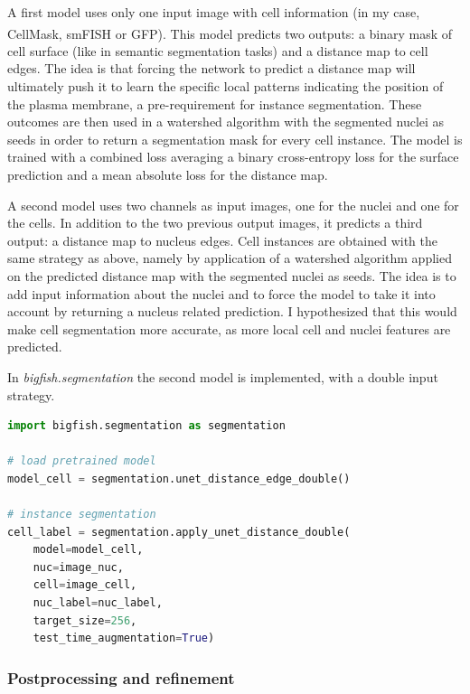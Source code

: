A first model uses only one input image with cell information (in my case, CellMask\textsuperscript{\texttrademark}, \ac{smFISH} or \ac{GFP}).
This model predicts two outputs: a binary mask of cell surface (like in semantic segmentation tasks) and a distance map to cell edges. 
The idea is that forcing the network to predict a distance map will ultimately push it to learn the specific local patterns indicating the position of the plasma membrane, a pre-requirement for instance segmentation. 
These outcomes are then used in a watershed algorithm with the segmented nuclei as seeds in order to return a segmentation mask for every cell instance.
The model is trained with a combined loss averaging a binary cross-entropy loss for the surface prediction and a mean absolute loss for the distance map.

A second model uses two channels as input images, one for the nuclei and one for the cells.
In addition to the two previous output images, it predicts a third output: a distance map to nucleus edges.
Cell instances are obtained with the same strategy as above, namely by application of a watershed algorithm  applied on the predicted distance map with the segmented nuclei as seeds.
The idea is to add input information about the nuclei and to force the model to take it into account by returning a nucleus related prediction.
I hypothesized that this would make cell segmentation more accurate, as more local cell and nuclei features are predicted.

In \emph{bigfish.segmentation} the second model is implemented, with a double input strategy.\\

\begin{minipage}{0.9\textwidth}
\begin{lstlisting}[language=Python]
import bigfish.segmentation as segmentation

# load pretrained model
model_cell = segmentation.unet_distance_edge_double()

# instance segmentation
cell_label = segmentation.apply_unet_distance_double(
    model=model_cell,
    nuc=image_nuc,
    cell=image_cell,
    nuc_label=nuc_label,
    target_size=256,
	test_time_augmentation=True)
\end{lstlisting}
\end{minipage}

\subsubsection{Postprocessing and refinement}

